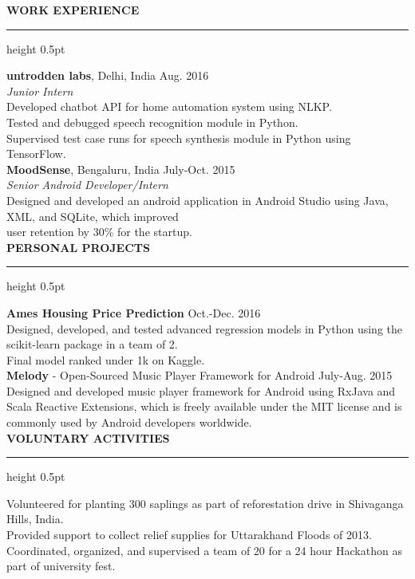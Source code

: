 \documentclass[a4paper]{article}
\newcommand{\myline}{\par
  \kern2pt %
  \hrule height 0.5pt
  \kern2pt %
}
\newcommand{\mybullet}{
	\indent \textbullet \hspace*{2mm}
}
\begin{document}
	\smallskip
	\smallskip
	\noindent
	{\large \textbf{WORK EXPERIENCE}}
	\myline 
	\smallskip
	
	\noindent
	\textbf{untrodden labs}, Delhi, India \hfill Aug. 2016 \\
	\textit{Junior Intern}\\
	\mybullet Developed chatbot API for home automation system using NLKP. \\
	\mybullet Tested and debugged speech recognition module in Python. \\
	\mybullet Supervised test case runs for speech synthesis module in Python using TensorFlow. \\
	
	\noindent
	\textbf{MoodSense}, Bengaluru, India \hfill July-Oct. 2015 \\
	\textit{Senior Android Developer/Intern} \\
	\mybullet Designed and developed an android application in Android Studio using Java, XML, and SQLite, which improved \\ 
	\indent\indent user retention by 30\% for the startup. \\
	
	\noindent
	{\large \textbf{PERSONAL PROJECTS}}
	\myline 
	\smallskip
	
	\noindent
	\textbf{Ames Housing Price Prediction} \hfill Oct.-Dec. 2016 \\
	\mybullet Designed, developed, and tested advanced regression models in Python using the scikit-learn package in a team of 2. \\
	\mybullet Final model ranked under 1k on Kaggle. \\
	
	\noindent
	\textbf{Melody} - Open-Sourced Music Player Framework for Android \hfill July-Aug. 2015 \\
	\mybullet Designed and developed music player framework for Android using RxJava and Scala Reactive Extensions, which is 
			freely \indent\indent available under the MIT license and is commonly used by Android developers worldwide. \\
	
	
	\noindent
	{\large \textbf{VOLUNTARY ACTIVITIES}}
	\myline 
	\smallskip
		
	\mybullet Volunteered for planting 300 saplings as part of reforestation drive in Shivaganga Hills, India. \\
	\mybullet Provided support to collect relief supplies for Uttarakhand Floods of 2013. \\
	\mybullet Coordinated, organized, and supervised a team of 20 for a 24 hour Hackathon as part of university fest. \\
	
\end{document}
